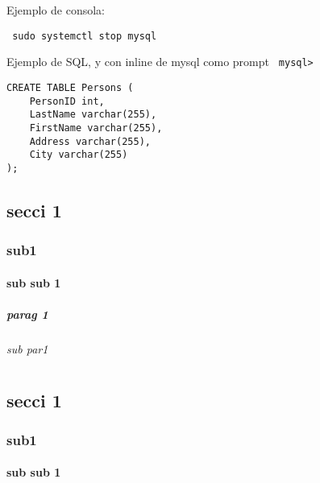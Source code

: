 \documentclass[12pt,a4paper,openany]{book}
\begin{document}
Ejemplo de consola: 	
\begin{verbatim}
 sudo systemctl stop mysql
\end{verbatim}

Ejemplo de SQL, y con inline de mysql como prompt \texttt{ mysql> }
\begin{verbatim}
CREATE TABLE Persons (
    PersonID int,
    LastName varchar(255),
    FirstName varchar(255),
    Address varchar(255),
    City varchar(255)
);
\end{verbatim}




\Blindtext[3]
\section{secci 1}
\Blindtext[3]
\subsection{sub1}
\Blindtext[3]
\subsubsection{sub sub 1}
\Blindtext[3]
\paragraph{parag 1}
\Blindtext[3]
\subparagraph{sub par1}
\Blindtext[3]

	





\chapter{}
\Blindtext[3]
\section{secci 1}
\Blindtext[3]
\subsection{sub1}
\Blindtext[3]
\subsubsection{sub sub 1}
\end{document}
